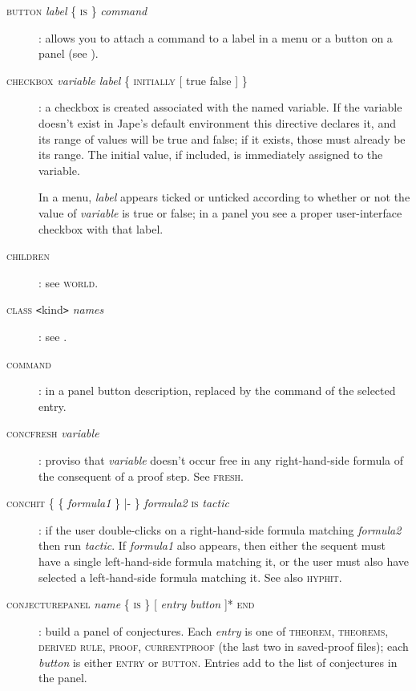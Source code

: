 \begin{description}
\item[\textsc{button} \textit{label} \{ \textsc{is} \} \textit{command}]: allows you to attach a command to a label in a menu or a button on a panel (see ).

\item[\textsc{checkbox} \textit{variable label} \{ \textsc{initially [} true {\textbar} false \textsc{]} \}]: a checkbox is created associated with the named variable. If the variable doesn't exist in Jape's default environment this directive declares it, and its range of values will be true and false; if it exists, those must already be its range. The initial value, if included, is immediately assigned to the variable.

In a menu, \textit{label} appears ticked or unticked according to whether or not the value of \textit{variable} is true or false; in a panel you see a proper user-interface checkbox with that label.

\item[\textsc{children}]: see \textsc{world}. 

\item[\textsc{class}  \texttt{<}kind\texttt{>} \textit{names}]: see .

\item[\textsc{command}]: in a panel button description, replaced by the command of the selected entry.

\item[\textsc{concfresh} \textit{variable}]: proviso that \textit{variable} doesn't occur free in any right-hand-side formula of the consequent of a proof step. See \textsc{fresh}.

\item[\textsc{conchit} \{ \{ \textit{formula1} \} |- \} \textit{formula2} \textsc{is} \textit{tactic}]: if the user double-clicks on a right-hand-side formula matching \textit{formula2} then run \textit{tactic}. If \textit{formula1} also appears, then either the sequent must have a single left-hand-side formula matching it, or the user must also have selected a left-hand-side formula matching it. See also \textsc{hyphit}.

\item[\textsc{conjecturepanel} \textit{name} \{ \textsc{is} \} {[} \textit{entry} {\textbar} \textit{button} {]}* \textsc{end}]: build a panel of conjectures. Each \textit{entry} is one of \textsc{theorem, theorems, derived rule, proof, currentproof} (the last two in saved-proof files); each \textit{button} is either \textsc{entry} or \textsc{button}. Entries add to the list of conjectures in the panel. 


\end{description}

